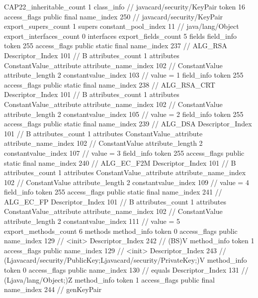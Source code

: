 {{{{{				}
			}
			CAP22_inheritable_count	1
		}
		class_info {		// javacard/security/KeyPair
			token	16
			access_flags	public final
			name_index	250		// javacard/security/KeyPair
			export_supers_count	1
			supers {
				constant_pool_index	11		// java/lang/Object
			}
			export_interfaces_count	0
			interfaces {
			}
			export_fields_count	5
			fields {
			field_info {
				token	255
				access_flags	public static final
				name_index	237		// ALG_RSA
				Descriptor_Index	101		// B
				attributes_count	1
				attributes {
				ConstantValue_attribute {
					attribute_name_index	102		// ConstantValue
					attribute_length	2
					constantvalue_index	103		// value = 1
				}
				}
			}
			field_info {
				token	255
				access_flags	public static final
				name_index	238		// ALG_RSA_CRT
				Descriptor_Index	101		// B
				attributes_count	1
				attributes {
				ConstantValue_attribute {
					attribute_name_index	102		// ConstantValue
					attribute_length	2
					constantvalue_index	105		// value = 2
				}
				}
			}
			field_info {
				token	255
				access_flags	public static final
				name_index	239		// ALG_DSA
				Descriptor_Index	101		// B
				attributes_count	1
				attributes {
				ConstantValue_attribute {
					attribute_name_index	102		// ConstantValue
					attribute_length	2
					constantvalue_index	107		// value = 3
				}
				}
			}
			field_info {
				token	255
				access_flags	public static final
				name_index	240		// ALG_EC_F2M
				Descriptor_Index	101		// B
				attributes_count	1
				attributes {
				ConstantValue_attribute {
					attribute_name_index	102		// ConstantValue
					attribute_length	2
					constantvalue_index	109		// value = 4
				}
				}
			}
			field_info {
				token	255
				access_flags	public static final
				name_index	241		// ALG_EC_FP
				Descriptor_Index	101		// B
				attributes_count	1
				attributes {
				ConstantValue_attribute {
					attribute_name_index	102		// ConstantValue
					attribute_length	2
					constantvalue_index	111		// value = 5
				}
				}
			}
			}
			export_methods_count	6
			methods {
				method_info {
					token	0
					access_flags	public
					name_index	129		// <init>
					Descriptor_Index	242		// (BS)V
				}
				method_info {
					token	1
					access_flags	public
					name_index	129		// <init>
					Descriptor_Index	243		// (Ljavacard/security/PublicKey;Ljavacard/security/PrivateKey;)V
				}
				method_info {
					token	0
					access_flags	public
					name_index	130		// equals
					Descriptor_Index	131		// (Ljava/lang/Object;)Z
				}
				method_info {
					token	1
					access_flags	public final
					name_index	244		// genKeyPair
}}}}}
